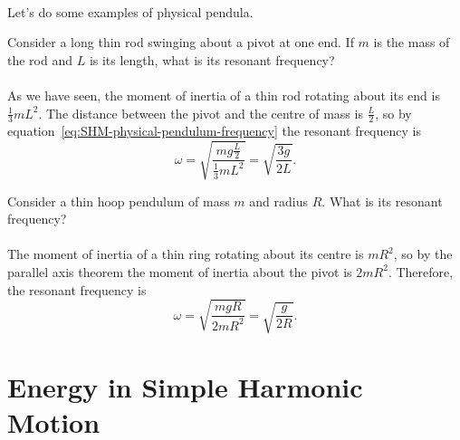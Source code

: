 \documentclass[../classical_mechanics.tex]{subfiles}
\begin{document}
        \paragraph{}
        Let's do some examples of physical pendula.
        \begin{example}
            Consider a long thin rod swinging about a pivot at one end.
            If $m$ is the mass of the rod and $L$ is its length, what is its resonant frequency?

            \paragraph{}
            As we have seen, the moment of inertia of a thin rod rotating about its end is $\frac{1}{3}mL^2$.
            The distance between the pivot and the centre of mass is $\frac{L}{2}$, so by equation~\ref{eq:SHM-physical-pendulum-frequency} the resonant frequency is
            \begin{equation}
                \omega=\sqrt{\frac{mg\frac{L}{2}}{\frac{1}{3}mL^2}}=\sqrt{\frac{3g}{2L}}.
            \end{equation}
        \end{example}
        \begin{example}
            Consider a thin hoop pendulum of mass $m$ and radius $R$.
            What is its resonant frequency?

            \paragraph{}
            The moment of inertia of a thin ring rotating about its centre is $mR^2$, so by the parallel axis theorem the moment of inertia about the pivot is $2mR^2$.
            Therefore, the resonant frequency is
            \begin{equation}
                \omega=\sqrt{\frac{mgR}{2mR^2}}=\sqrt{\frac{g}{2R}}.
            \end{equation}
        \end{example}

    \section{Energy in Simple Harmonic Motion}\label{sec:energy-in-simple-harmonic-motion}
\end{document}
